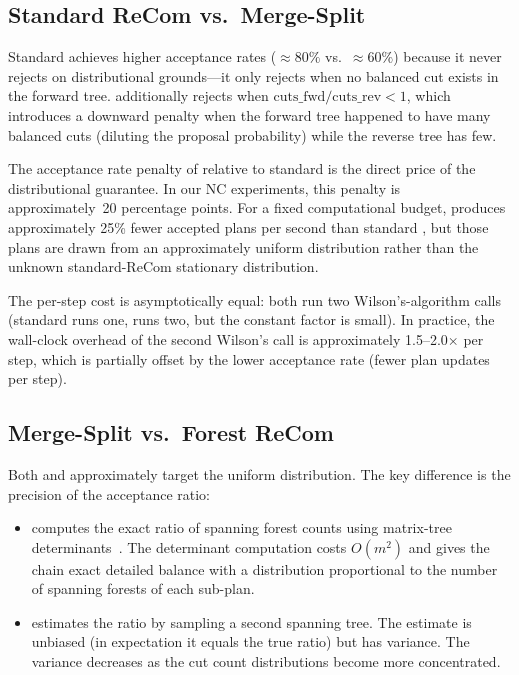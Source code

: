 \subsection{Standard ReCom vs.\ Merge-Split}

Standard \recom{} achieves higher acceptance rates ($\approx\!80\%$ vs.\
$\approx\!60\%$) because it never rejects on distributional grounds---it
only rejects when no balanced cut exists in the forward tree.
\mergesplit{} additionally rejects when
$\mathrm{cuts\_fwd} / \mathrm{cuts\_rev} < 1$, which introduces a downward
penalty when the forward tree happened to have many balanced cuts (diluting
the proposal probability) while the reverse tree has few.

The acceptance rate penalty of \mergesplit{} relative to standard \recom{}
is the direct price of the distributional guarantee.
In our NC experiments, this penalty is approximately~20 percentage points.
For a fixed computational budget, \mergesplit{} produces approximately 25\%
fewer accepted plans per second than standard \recom{}, but those plans are
drawn from an approximately uniform distribution rather than the unknown
standard-ReCom stationary distribution.

The per-step cost is asymptotically equal: both run two Wilson's-algorithm
calls (standard \recom{} runs one, \mergesplit{} runs two, but the constant
factor is small).
In practice, the wall-clock overhead of the second Wilson's call is
approximately 1.5--2.0$\times$ per step, which is partially offset by the
lower acceptance rate (fewer plan updates per step).

\subsection{Merge-Split vs.\ Forest ReCom}

Both \mergesplit{} and \forestrecom{} approximately target the uniform
distribution.
The key difference is the precision of the acceptance ratio:

\begin{itemize}
  \item \forestrecom{} computes the exact ratio of spanning forest counts
        using matrix-tree determinants~\citep{mccartan2020}.
        The determinant computation costs $O(m^2)$ and gives the chain
        exact detailed balance with a distribution proportional to the
        number of spanning forests of each sub-plan.

  \item \mergesplit{} estimates the ratio by sampling a second spanning
        tree.
        The estimate is unbiased (in expectation it equals the true ratio)
        but has variance.
        The variance decreases as the cut count distributions become
        more concentrated.
\end{itemize}

